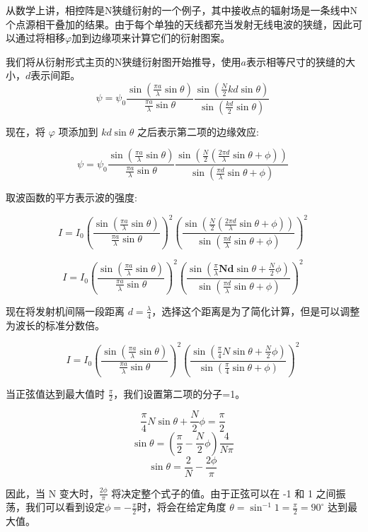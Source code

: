 从数学上讲，相控阵是N狭缝衍射的一个例子，其中接收点的辐射场是一条线中N个点源相干叠加的结果。由于每个单独的天线都充当发射无线电波的狭缝，因此可以通过将相移$\varphi$加到边缘项来计算它们的衍射图案。

我们将从衍射形式主页的N狭缝衍射图开始推导，使用$a$表示相等尺寸的狭缝的大小，$d$表示间距。
$$\psi = \psi_0 \frac{\sin\left( \frac{\pi a}{\lambda} \sin \theta \right)}{\frac{\pi a}{\lambda} \sin \theta} \frac{\sin\left( \frac{N}{2} kd \sin \theta \right)}{\sin \left( \frac{kd}{2} \sin \theta \right)}~$$

现在，将 $\varphi$ 项添加到 $kd \sin \theta$ 之后表示第二项的边缘效应:

$$\psi = \psi_0 \frac{\sin\left( \frac{\pi a}{\lambda} \sin \theta \right)}{\frac{\pi a}{\lambda} \sin \theta} \frac{\sin\left( \frac{N}{2} \left(  \frac{2\pi d}{\lambda} \sin \theta + \phi \right) \right)}{\sin \left( \frac{\pi d}{\lambda} \sin \theta + \phi \right)}~$$

取波函数的平方表示波的强度:

$$I = I_0 \left( \frac{\sin\left( \frac{\pi a}{\lambda} \sin \theta \right)}{\frac{\pi a}{\lambda} \sin \theta} \right)^2 \left( \frac{\sin\left( \frac{N}{2} \left( \frac{2\pi d}{\lambda} \sin \theta + \phi \right) \right)}{\sin \left( \frac{\pi d}{\lambda} \sin \theta + \phi \right)} \right)^2~$$

$$I = I_0 \left( \frac{\sin\left( \frac{\pi a}{\lambda} \sin \theta \right)}{\frac{\pi a}{\lambda} \sin \theta} \right)^2 \left( \frac{\sin\left( \frac{\pi}{\lambda}\mathbf{Nd}\sin \theta + \frac{N}{2} \phi \right)}{\sin \left( \frac{\pi d}{\lambda} \sin \theta + \phi \right)} \right)^2~$$

现在将发射机间隔一段距离 $d = \frac{\lambda}{4}$，选择这个距离是为了简化计算，但是可以调整为波长的标准分数倍。

$$I = I_0 \left( \frac{\sin \left( \frac{\pi a}{\lambda} \sin \theta \right)}{\frac{\pi a}{\lambda} \sin \theta} \right)^2 \left( \frac{\sin \left( \frac{\pi}{4} N \sin \theta + \frac{N}{2} \phi \right)}{\sin \left( \frac{\pi}{4} \sin \theta + \phi \right)} \right)^2~$$

当正弦值达到最大值时 $\frac{\pi}{2}$，我们设置第二项的分子=1。

$$\frac{\pi}{4} N \sin \theta + \frac{N}{2} \phi = \frac{\pi}{2}~$$
$$\sin \theta = \left( \frac{\pi}{2} - \frac{N}{2} \phi \right) \frac{4}{N \pi}~$$
$$\sin \theta = \frac{2}{N} - \frac{2 \phi}{\pi}~$$

因此，当 N 变大时，$\frac{2\phi}{\pi}$ 将决定整个式子的值。由于正弦可以在 -1 和 1 之间振荡，我们可以看到设定$\phi = -\frac{\pi}{2}$时，将会在给定角度 $\theta = \sin^{-1} 1 = \frac{\pi}{2} = 90^\circ$ 达到最大值。

